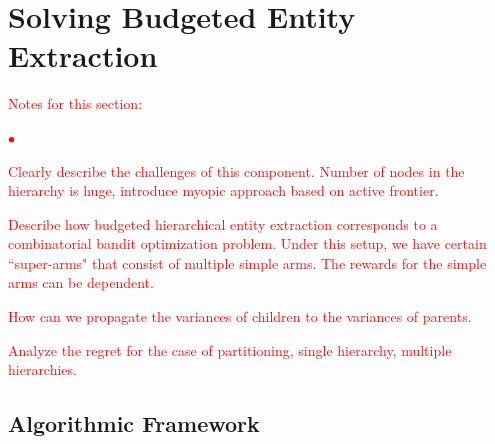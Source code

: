 \documentclass{vldb}
\newcommand{\squishlist}{
   \begin{list}{$\bullet$}
    {
      \setlength{\itemsep}{0pt}
      \setlength{\parsep}{3pt}
      \setlength{\topsep}{3pt}
      \setlength{\partopsep}{0pt}
      \setlength{\leftmargin}{1.5em}
      \setlength{\labelwidth}{1em}
      \setlength{\labelsep}{0.5em} } }
\newcommand{\squishend}{
    \end{list}  }
\begin{document}
%

\section{Solving Budgeted Entity Extraction}
\label{sec:solution}
\textcolor{red}{Notes for this section:
\squishlist
\item Clearly describe the challenges of this component. Number of  nodes in the hierarchy is huge, introduce myopic approach based on active frontier. 
\item Describe how budgeted hierarchical entity extraction corresponds to a combinatorial bandit optimization problem. Under this setup, we have certain ``super-arms" that consist of multiple simple arms. The rewards for the simple arms can be dependent. 
\item How can we propagate the variances of children to the variances of parents. 
\item Analyze the regret for the case of partitioning, single hierarchy, multiple hierarchies.
\squishend}
\subsection{Algorithmic Framework}
\end{document}
